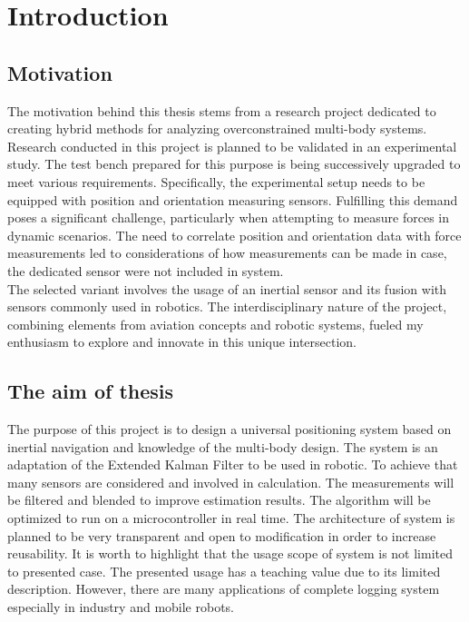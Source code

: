 \chapter{Introduction}

\section{Motivation}

The motivation behind this thesis stems from a research project dedicated to creating hybrid methods for analyzing overconstrained multi-body systems. Research conducted in this project is planned to be validated in an experimental study. The test bench prepared for this purpose is being successively upgraded to meet various requirements. Specifically, the experimental setup needs to be equipped with position and orientation measuring sensors. Fulfilling this demand poses a significant challenge, particularly when attempting to measure forces in dynamic scenarios. The need to correlate position and orientation data with force measurements led to considerations of how measurements can be made in case, the dedicated sensor were not included in system.\\

The selected variant involves the usage of an inertial sensor and its fusion with sensors commonly used in robotics. The interdisciplinary nature of the project, combining elements from aviation concepts and robotic systems, fueled my enthusiasm to explore and innovate in this unique intersection.

\section{The aim of thesis}

The purpose of this project is to design a universal positioning system based on inertial navigation and knowledge of the multi-body design. The system is an adaptation of the Extended Kalman Filter to be used in robotic. To achieve that many sensors are considered and involved in calculation. The measurements will be filtered and blended to improve estimation results. The algorithm will be optimized to run on a microcontroller in real time. The architecture of system is planned to be very transparent and open to modification in order to increase reusability. It is worth to highlight that the usage scope of system is not limited to presented case. The presented usage has a teaching value due to its limited description. However, there are many applications of complete logging system especially in industry and mobile robots.\\

